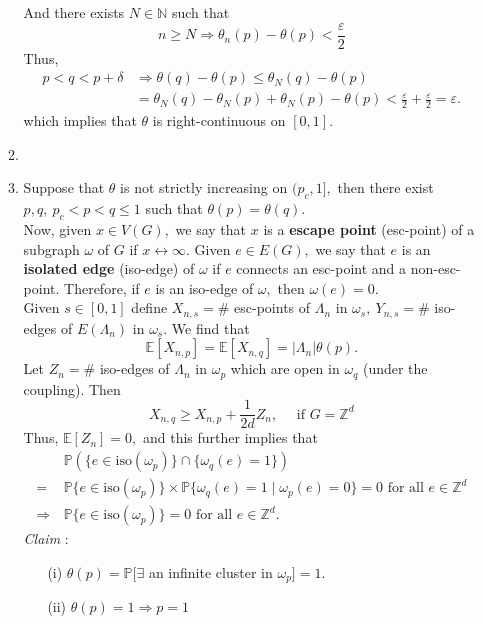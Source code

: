 \documentclass[12pt,a4paper]{report}
\theoremstyle{definition}
\begin{document}
\begin{enumerate}
\begin{enumerate}
\[	    \]
	    And there exists $N\in \mathbb{N}$ such that 
	    \[
	    n\geq N\Rightarrow \theta_n(p)-\theta(p)< \frac{\varepsilon}{2}
	    \]
	    Thus,
	    \begin{align*}
	    p<q<p+\delta&\Rightarrow \theta(q)-\theta(p)\leq \theta_N(q)-\theta(p)\\
	    &=\theta_N(q)-\theta_N(p)+\theta_N(p)-\theta(p)<\frac{\varepsilon}{2}+\frac{\varepsilon}{2}=\varepsilon.	        
	    \end{align*}
	    which implies that $\theta$ is right-continuous on $[0,1].$
	    \item
	    \item Suppose that $\theta$ is not strictly increasing on $(p_c,1],$ then there exist $ p,q,\ p_c<p<q\leq 1$ such that $\theta(p)=\theta(q).$\\
	    Now, given $x\in V(G),$ we say that $x$ is a \textbf{escape point} (esc-point) of a subgraph $\omega$ of $G$ if $x\leftrightarrow\infty.$ Given $e\in E(G),$ we say that $e$ is an \textbf{isolated edge} (iso-edge) of $\omega$ if $e$ connects an esc-point and a non-esc-point. Therefore, if $e$ is an iso-edge of $\omega,$ then $\omega(e)=0.$\\
	    Given $s\in [0,1]$ define $X_{n,s}=\#$ esc-points of $\Lambda_n$ in $\omega_s,\ Y_{n,s}=\#$ iso-edges of $E(\Lambda_n)$ in $\omega_s.$ We find that
	    \[
	    \mathbb{E}[X_{n,p}]=\mathbb{E}[X_{n,q}]=|\Lambda_n|\theta(p).
	    \]
	    Let $Z_n=\#$ iso-edges of $\Lambda_n$ in $\omega_p$ which are open in $\omega_q$ (under the coupling). Then
	    \[
	    X_{n,q}\geq X_{n,p}+\frac{1}{2d}Z_n,\quad \mbox{ if } G=\mathbb{Z}^d
	    \]
	    Thus, $\mathbb{E}[Z_n]=0,$ and this further implies that
	    \begin{align*}
	    &\mathbb{P}(\{e\in \mathrm{iso}(\omega_p)\}\cap \{\omega_q(e)=1\})\\
	    =\,&\mathbb{P}\{e\in\mathrm{iso}(\omega_p)\}\times \mathbb{P}\{\omega_q(e)=1\mid \omega_p(e)=0\}=0\mbox{ for all }e\in \mathbb{Z}^d\\
	    \Rightarrow\, & \mathbb{P}\{e\in\mathrm{iso}(\omega_p)\}=0\mbox{ for all }e\in\mathbb{Z}^d.
	    \end{align*}
	    \textit{Claim} : 
	    \begin{enumerate}
	        \item[(i)] $\theta(p)=\mathbb{P}[\exists$ an infinite cluster in $\omega_p]=1.$
	        \item[(ii)] $\theta(p)=1\Rightarrow p=1$
	    \end{enumerate} 

\end{enumerate}
\end{enumerate}
\end{document}
